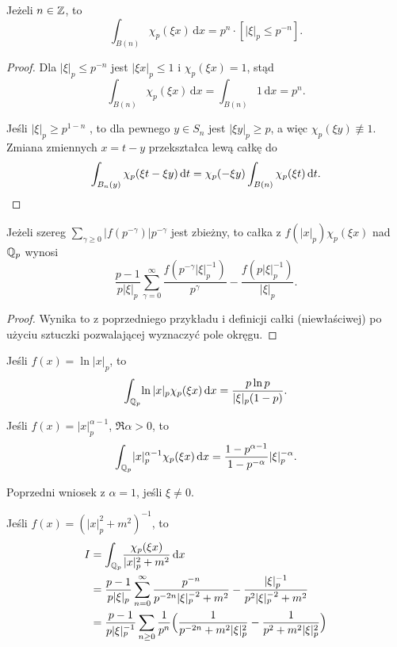 \begin{przyklad}
	Jeżeli $n \in \mathbb Z$, to
	\[
		\int_{B(n)}\! \chi_p(\xi x) \,\textrm{d}x = p^n \cdot [|\xi|_p \le p^{-n}].
	\]
\end{przyklad}

\begin{proof}
	Dla $|\xi|_p \le p^{-n}$ jest $|\xi x|_p \le 1$ i $\chi_p(\xi x) = 1$, stąd
	\[
		\int_{B(n)} \chi_p(\xi x)\,\textrm{d}x = \int_{B(n)} 1 \,\textrm{d}x = p^n.
	\]

	Jeśli $|\xi|_p \ge p^{1-n}$	, to dla pewnego $y \in S_n$ jest $|\xi y|_p \ge p$, a więc $\chi_p(\xi y) \not \equiv 1$.
	Zmiana zmiennych $x = t - y$ przekształca lewą całkę do
	\[
		\int_{B_n(y)} \chi_p(\xi t - \xi y)\,\textrm{d} t = \chi_p(- \xi y) \int_{B(n)} \chi_p(\xi t) \,\textrm{d} t. \qedhere
	\]
\end{proof}

\begin{przyklad}
	Jeżeli szereg $\sum_{\gamma \ge 0} |f(p^{-\gamma})| p^{-\gamma}$ jest zbieżny, to całka z $f(|x|_p) \chi_p(\xi x)$ nad $\mathbb Q_p$ wynosi
	\[
		\frac{p-1}{p|\xi|_p} \sum_{\gamma=0}^\infty \frac{f(p^{-\gamma}|\xi|_p^{-1})}{p^\gamma} - \frac{f(p|\xi|_p^{-1})}{|\xi|_p}.
	\]
\end{przyklad}

\begin{proof}
	Wynika to z poprzedniego przykładu i definicji całki (niewłaściwej) po użyciu sztuczki pozwalającej wyznaczyć pole okręgu.
\end{proof}

\begin{wniosek}
	Jeśli $f (x) = \ln |x|_p$, to
	\[
		\int_{\mathbb Q_p} \! \ln |x|_p \chi_p(\xi x) \,\textrm{d}x = \frac{p \ln p}{|\xi|_p (1-p)}.
	\]
\end{wniosek}

\begin{wniosek}
	Jeśli $f (x) = |x|_p^{\alpha - 1}$, $\Re \alpha > 0$, to
	\[
		\int_{\mathbb Q_p} \! |x|_p^{\alpha - 1} \chi_p(\xi x) \,\textrm{d}x = \frac{1-p^{\alpha-1}}{1- p^{-\alpha}} |\xi|_p^{-\alpha}.
	\]
\end{wniosek}

\begin{wniosek}
	Poprzedni wniosek z $\alpha = 1$, jeśli $\xi \neq 0$.
\end{wniosek}

\begin{przyklad}
	Jeśli $f(x) = (|x|_p^2 + m^2)^{-1}$, to
	\begin{align*}
		I & = \int_{\mathbb Q_p} \!\frac{\chi_p(\xi x)}{|x|_p^2 + m^2} \,\textrm{d}x \\
		& = \frac{p - 1}{p|\xi|_p} \sum_{n = 0}^\infty \frac{p^{-n}}{p^{-2n}|\xi|_p^{-2} + m^2} - \frac{|\xi|_p^{-1}}{p^2|\xi|_p^{-2} + m^2} \\
		& = \frac{p - 1}{p|\xi|_p^{-1}} \sum_{n \ge 0} \frac{1}{p^n} \Bigl(\frac{1}{p^{-2n}+m^2|\xi|_p^2}-\frac{1}{p^2+m^2|\xi|_p^2} \Bigr)
	\end{align*}
\end{przyklad}

